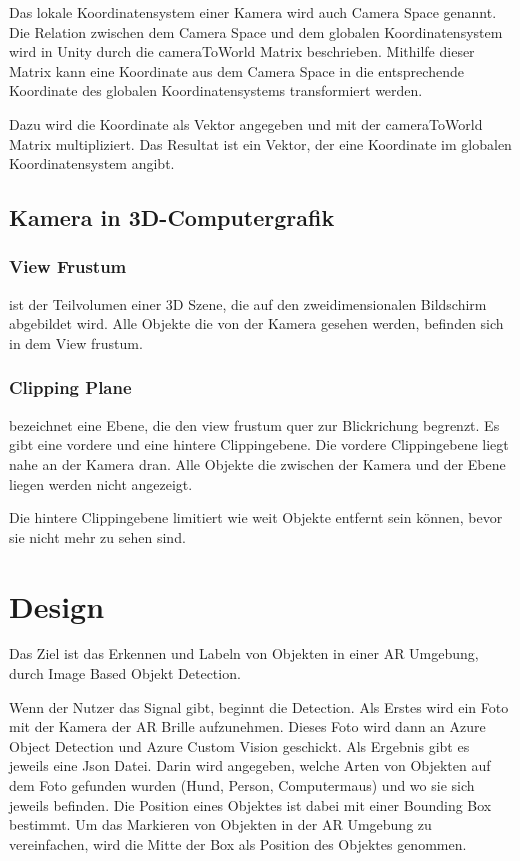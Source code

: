 \documentclass[german,a4paper, 12pt]{llncs}
\begin{document}
Das lokale Koordinatensystem einer Kamera wird auch Camera Space genannt. Die Relation zwischen dem Camera Space und dem globalen Koordinatensystem wird in Unity durch die cameraToWorld Matrix beschrieben. Mithilfe dieser Matrix kann eine Koordinate aus dem Camera Space in die entsprechende Koordinate des globalen Koordinatensystems transformiert werden.\cite{unitycameratoworldmatrix}

Dazu wird die Koordinate als Vektor angegeben und mit der cameraToWorld Matrix multipliziert. Das Resultat ist ein Vektor, der eine Koordinate im globalen Koordinatensystem angibt.\cite{unitycameratoworldmatrix,unitymultiplyoint}

\subsection{Kamera in 3D-Computergrafik}
\subsubsection{View Frustum}
ist der Teilvolumen einer 3D Szene, die auf den zweidimensionalen Bildschirm abgebildet wird. Alle Objekte die von der Kamera gesehen werden, befinden sich in dem View frustum.

\subsubsection{Clipping Plane}
bezeichnet eine Ebene, die den view frustum quer zur Blickrichung begrenzt. 
Es gibt eine vordere und eine hintere Clippingebene.
Die vordere Clippingebene liegt nahe an der Kamera dran. Alle Objekte die zwischen der Kamera und der Ebene liegen werden nicht angezeigt.

Die hintere Clippingebene limitiert wie weit Objekte entfernt sein können, bevor sie nicht mehr zu sehen sind.


\section{Design}
Das Ziel ist das Erkennen und Labeln von Objekten in einer AR Umgebung, durch Image Based Objekt Detection.

Wenn der Nutzer das Signal gibt, beginnt die Detection. Als Erstes wird ein Foto mit der Kamera der AR Brille aufzunehmen. 
Dieses Foto wird dann an Azure Object Detection und Azure Custom Vision geschickt. 
Als Ergebnis gibt es jeweils eine Json Datei. Darin wird angegeben, welche Arten von Objekten auf dem Foto gefunden wurden (Hund, Person, Computermaus) und wo sie sich jeweils befinden. Die Position eines Objektes ist dabei mit einer Bounding Box bestimmt. Um das Markieren von Objekten in der AR Umgebung zu vereinfachen, wird die Mitte der Box als Position des Objektes genommen.
\end{document}
